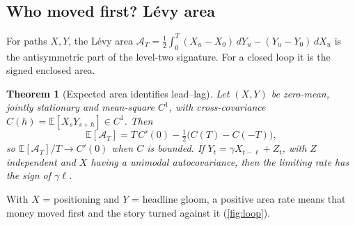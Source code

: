 \documentclass{article}
\theoremstyle{plain}
\newtheorem{theorem}{Theorem}[section]
\theoremstyle{definition}
\theoremstyle{remark}
\newcommand{\E}{\mathbb{E}}
\begin{document}
\subsection{Who moved first? L\'evy area}\label{sec:leadlag}

For paths $X,Y$, the L\'evy area $\mathcal{A}_T=\tfrac12\int_0^T(X_u-X_0)\,dY_u-(Y_u-Y_0)\,dX_u$ is the antisymmetric part of the level-two signature. For a closed loop it is the signed enclosed area.

\begin{theorem}[Expected area identifies lead--lag]\label{thm:levy}
Let $(X,Y)$ be zero-mean, jointly stationary and mean-square $C^1$, with cross-covariance $C(h)=\E[X_sY_{s+h}]\in C^1$. Then
\[
  \E[\mathcal{A}_T]=T\,C'(0)-\tfrac12\big(C(T)-C(-T)\big),
\]
so $\E[\mathcal{A}_T]/T\to C'(0)$ when $C$ is bounded. If $Y_t=\gamma X_{t-\ell}+Z_t$, with $Z$ independent and $X$ having a unimodal autocovariance, then the limiting rate has the sign of $\gamma\ell$.
\end{theorem}

With $X$ = positioning and $Y$ = headline gloom, a positive area rate means that money moved first and the story turned against it (\cref{fig:loop}).
\end{document}
